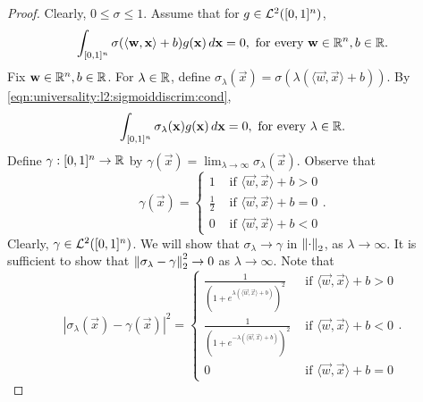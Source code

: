\begin{proof}
Clearly, $0 \leq \sigma \leq 1$.
Assume that for $g \in {\mathcal {L}^2}([0,1]^n)$, \begin{align}
        \label{eqn:universality:l2:sigmoiddiscrim:cond}
        \int_{[0,1]^n} \sigma(\langle \mathbf{w}, \mathbf{x} \rangle + b) g(\mathbf{x}) \, d\mathbf{x} = 0, \text{ for every $\mathbf{w} \in {\mathbb R}^n, b \in {\mathbb R}$}.
\end{align}
Fix $\mathbf{w} \in {\mathbb R}^n, b \in {\mathbb R}$. For $\lambda \in {\mathbb R}$, define $\sigma_\lambda (\vec{x}) = \sigma (\lambda (\langle \vec{w}, \vec{x} \rangle + b) )$. By \ref{eqn:universality:l2:sigmoiddiscrim:cond}, 
\begin{align}
    \label{eqn:universality:l2:sigmoiddiscrim:lambdacond}
    \int_{[0,1]^n} \sigma_\lambda (\mathbf{x}) g(\mathbf{x}) \, d\mathbf{x} = 0, \text{ for every $\lambda \in {\mathbb R}$}.
\end{align}
Define $\gamma: [0,1]^n \to {\mathbb R}$ by $\gamma(\vec{x}) = \lim_{\lambda \to \infty} \sigma_{\lambda} (\vec{x})$. Observe that  \begin{equation}
    \label{eqn:universality:l2:sigmoiddiscrim:gamma}
    \gamma(\vec{x}) =
    \begin{cases}
      1         & \text{ if } \langle \vec{w}, \vec{x} \rangle + b > 0 \\
      \frac{1}{2} & \text{ if } \langle \vec{w}, \vec{x} \rangle + b = 0 \\
      0         & \text{ if } \langle \vec{w}, \vec{x} \rangle + b < 0
    \end{cases}.
  \end{equation}
Clearly, $\gamma \in {\mathcal {L}^2}([0,1]^n)$. We will show that $\sigma_\lambda \to \gamma$ in $\left\lVert\cdot\right\rVert_2$, as $\lambda \to \infty$. It is sufficient to show that $\left\lVert\sigma_\lambda - \gamma\right\rVert_2^2 \to 0$ as $\lambda \to \infty$. Note that 
 \begin{equation*}
    \label{eqn:universality:l2:sigmoiddiscrim:diff}
    |\sigma_\lambda(\vec{x}) - \gamma(\vec{x})|^2 =
    \begin{cases}
      \frac{1}{ \left ( 1 + e^{\lambda ( \langle \vec{w}, \vec{x} \rangle + b ) } \right)^2}& \text{ if } \langle \vec{w}, \vec{x} \rangle + b > 0 \\
      \frac{1}{ \left ( 1 + e^{-\lambda ( \langle \vec{w}, \vec{x} \rangle + b ) } \right)^2}& \text{ if } \langle \vec{w}, \vec{x} \rangle + b < 0 \\
      0         & \text{ if }  \langle \vec{w}, \vec{x} \rangle + b = 0 
    \end{cases}.

\end{equation*}
\end{proof}
